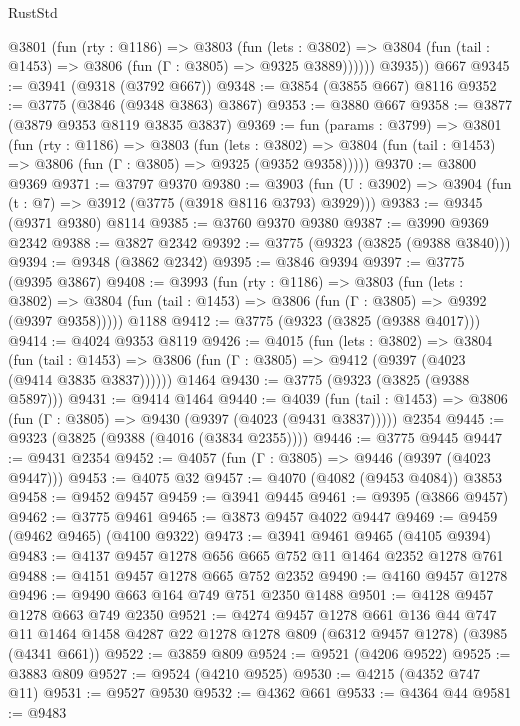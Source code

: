 \begin{lexlean}{RustStd}
\begin{coremodule}
          @3801
            (fun (rty : @1186) =>
            @3803
              (fun (lets : @3802) =>
              @3804 (fun (tail : @1453) => @3806 (fun (Γ : @3805) => @9325 @3889))))))
        @3935))
    @667
@9345 := @3941 (@9318 (@3792 @667))
@9348 := @3854 (@3855 @667) @8116
@9352 := @3775 (@3846 (@9348 @3863) @3867)
@9353 := @3880 @667
@9358 := @3877 (@3879 @9353 @8119 @3835 @3837)
@9369 := fun (params : @3799) =>
  @3801
    (fun (rty : @1186) =>
    @3803
      (fun (lets : @3802) =>
      @3804 (fun (tail : @1453) => @3806 (fun (Γ : @3805) => @9325 (@9352 @9358)))))
@9370 := @3800 @9369
@9371 := @3797 @9370
@9380 := @3903 (fun (U : @3902) => @3904 (fun (t : @7) => @3912 (@3775 (@3918 @8116 @3793) @3929)))
@9383 := @9345 (@9371 @9380) @8114
@9385 := @3760 @9370 @9380
@9387 := @3990 @9369 @2342
@9388 := @3827 @2342
@9392 := @3775 (@9323 (@3825 (@9388 @3840)))
@9394 := @9348 (@3862 @2342)
@9395 := @3846 @9394
@9397 := @3775 (@9395 @3867)
@9408 := @3993
    (fun (rty : @1186) =>
    @3803
      (fun (lets : @3802) =>
      @3804 (fun (tail : @1453) => @3806 (fun (Γ : @3805) => @9392 (@9397 @9358)))))
    @1188
@9412 := @3775 (@9323 (@3825 (@9388 @4017)))
@9414 := @4024 @9353 @8119
@9426 := @4015
    (fun (lets : @3802) =>
    @3804
      (fun (tail : @1453) => @3806 (fun (Γ : @3805) => @9412 (@9397 (@4023 (@9414 @3835 @3837))))))
    @1464
@9430 := @3775 (@9323 (@3825 (@9388 @5897)))
@9431 := @9414 @1464
@9440 := @4039
    (fun (tail : @1453) => @3806 (fun (Γ : @3805) => @9430 (@9397 (@4023 (@9431 @3837)))))
    @2354
@9445 := @9323 (@3825 (@9388 (@4016 (@3834 @2355))))
@9446 := @3775 @9445
@9447 := @9431 @2354
@9452 := @4057 (fun (Γ : @3805) => @9446 (@9397 (@4023 @9447)))
@9453 := @4075 @32
@9457 := @4070 (@4082 (@9453 @4084)) @3853
@9458 := @9452 @9457
@9459 := @3941 @9445
@9461 := @9395 (@3866 @9457)
@9462 := @3775 @9461
@9465 := @3873 @9457 @4022 @9447
@9469 := @9459 (@9462 @9465) (@4100 @9322)
@9473 := @3941 @9461 @9465 (@4105 @9394)
@9483 := @4137 @9457 @1278 @656 @665 @752 @11 @1464 @2352 @1278 @761
@9488 := @4151 @9457 @1278 @665 @752 @2352
@9490 := @4160 @9457 @1278
@9496 := @9490 @663 @164 @749 @751 @2350 @1488
@9501 := @4128 @9457 @1278 @663 @749 @2350
@9521 := @4274
    @9457
    @1278
    @661
    @136
    @44
    @747
    @11
    @1464
    @1458
    @4287
    @22
    @1278
    @1278
    @809
    (@6312 @9457 @1278)
    (@3985 (@4341 @661))
@9522 := @3859 @809
@9524 := @9521 (@4206 @9522)
@9525 := @3883 @809
@9527 := @9524 (@4210 @9525)
@9530 := @4215 (@4352 @747 @11)
@9531 := @9527 @9530
@9532 := @4362 @661
@9533 := @4364 @44
@9581 := @9483

\end{coremodule}
\end{lexlean}
